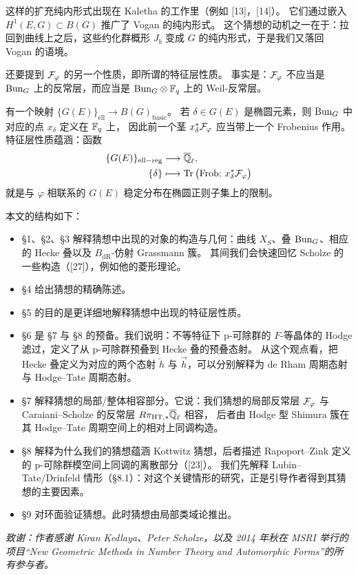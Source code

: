 这样的扩充纯内形式出现在 Kaletha 的工作里（例如 [13]，[14]）。
它们通过嵌入 $H^1(E,G)\subset B(G)$ 推广了 Vogan 的纯内形式。
这个猜想的动机之一在于：拉回到曲线上之后，这些约化群概形 $J_b$ 变成 $G$ 的纯内形式，于是我们又落回 Vogan 的语境。

还要提到 $\mathcal{F}_\varphi$ 的另一个性质，即所谓的特征层性质。
事实是：$\mathcal{F}_\varphi$ 不应当是 $\mathrm{Bun}_G$ 上的反常层，而应当是 $\mathrm{Bun}_G\otimes\mathbb{F}_q$ 上的 Weil-反常层。

有一个映射 $\{G(E)\}_{\mathrm{ell}}\to B(G)_{\mathrm{basic}}$。
若 $\delta\in G(E)$ 是椭圆元素，则 $\mathrm{Bun}_G$ 中对应的点 $x_\delta$ 定义在 $\mathbb{F}_q$ 上，
因此前一个茎 $x_\delta^*\mathcal{F}_\varphi$ 应当带上一个 Frobenius 作用。特征层性质蕴涵：函数
\begin{equation}\label{eq:0.2}
\begin{aligned}
\{G(E)\}_{\mathrm{ell-reg}} &\longrightarrow \overline{\mathbb{Q}}_\ell,\\
\{\delta\} &\longmapsto \operatorname{Tr}\big(\mathrm{Frob};\,x_\delta^*\mathcal{F}_\varphi\big)
\end{aligned}
\end{equation}
就是与 $\varphi$ 相联系的 $G(E)$ 稳定分布在椭圆正则子集上的限制。

本文的结构如下：
\begin{itemize}
\item §1、§2、§3 解释猜想中出现的对象的构造与几何：曲线 $X_S$、叠 $\mathrm{Bun}_G$、相应的 Hecke 叠以及 $B_{\mathrm{dR}}$-仿射 Grassmann 簇。
  其间我们会快速回忆 Scholze 的一些构造（[27]），例如他的菱形理论。
\item §4 给出猜想的精确陈述。
\item §5 的目的是更详细地解释猜想中出现的特征层性质。
\item §6 是 §7 与 §8 的预备。我们说明：不等特征下 p-可除群的 $F$-等晶体的 Hodge 滤过，定义了从 p-可除群预叠到 Hecke 叠的预叠态射。
  从这个观点看，把 Hecke 叠定义为对应的两个态射 $\overleftarrow{h}$ 与 $\overrightarrow{h}$，可以分别解释为 de Rham 周期态射与 Hodge–Tate 周期态射。
\item §7 解释猜想的局部/整体相容部分。它说：我们猜想的局部反常层 $\mathcal{F}_\varphi$ 与 Caraiani–Scholze 的反常层 $R\pi_{\mathrm{HT},*}\overline{\mathbb{Q}}_\ell$ 相容，
  后者由 Hodge 型 Shimura 簇在其 Hodge–Tate 周期空间上的相对上同调构造。
\item §8 解释为什么我们的猜想蕴涵 Kottwitz 猜想，后者描述 Rapoport–Zink 定义的 p-可除群模空间上同调的离散部分（[23]）。
  我们先解释 Lubin–Tate/Drinfeld 情形（§8.1）：对这个关键情形的研​究，正是引导作者得到其猜想的主要因素。
\item §9 对环面验证猜想。此时猜想由局部类域论推出。
\end{itemize}

\begin{flushleft}
\itshape 致谢：作者感谢 Kiran Kedlaya、Peter Scholze，以及 2014 年秋在 MSRI 举行的项目“New Geometric Methods in Number Theory and Automorphic Forms”的所有参与者。
\end{flushleft}
